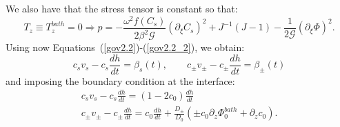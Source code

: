\documentclass[12pt]{extarticle}
\begin{document}
We also have that the stress tensor is constant so that:
\begin{equation}
T_z\equiv T^{bath}_z=0 \Rightarrow p =-\frac{\omega^2 f(C_s)}{2\beta^2\mathcal{G}} (\partial_\xi C_s)^2+ J^{-1}\left(J-1\right)-\frac{1}{2\mathcal{G}} (\partial_\xi \Phi)^2.
\end{equation}
Using now Equations~(\ref{gov2.2})-(\ref{gov2.2_2}), we obtain:
\begin{equation}
c_s v_s - c_s \frac{dh}{dt}=\beta_s(t), \qquad c_\pm v_\pm - c_\pm \frac{dh}{dt}=\beta_\pm(t)
\end{equation}
and imposing the boundary condition at the interface:
\begin{gather}
c_s v_s - c_s \frac{dh}{dt}=(1-2c_0)\frac{dh}{dt}\\
c_\pm v_\pm - c_\pm \frac{dh}{dt}=c_0 \frac{dh}{dt}  +\frac{D_\pm}{D_0}\left(\pm c_0 \partial_z \Phi^{bath}_0+\partial_z c_0\right).
\end{gather}
\end{document}

